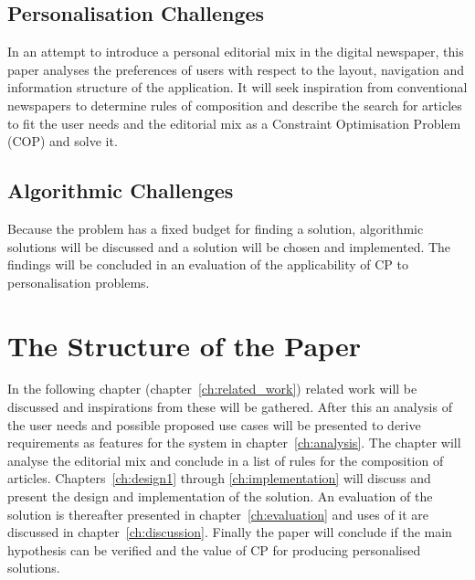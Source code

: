 \subsection{Personalisation Challenges}
In an attempt to introduce a personal editorial mix in the digital newspaper, this paper analyses the preferences of users with respect to the layout, navigation and information structure of the application. It will seek inspiration from conventional newspapers to determine rules of composition and describe the search for articles to fit the user needs and the editorial mix as a Constraint Optimisation Problem (COP) and solve it. %

\subsection{Algorithmic Challenges}
Because the problem has a fixed budget for finding a solution, algorithmic solutions will be discussed and a solution will be chosen and implemented. The findings will be concluded in an evaluation of the applicability of CP to personalisation problems.

\clearpage
\section{The Structure of the Paper}
In the following chapter (chapter~\ref{ch:related_work}) related work will be discussed and inspirations from these will be gathered. After this an analysis of the user needs and possible proposed use cases will be presented to derive requirements as features for the system in chapter~\ref{ch:analysis}. The chapter will analyse the editorial mix and conclude in a list of rules for the composition of articles. Chapters~\ref{ch:design1} through \ref{ch:implementation} will discuss and present the design and implementation of the solution. An evaluation of the solution is thereafter presented in chapter~\ref{ch:evaluation} and uses of it are discussed in chapter~\ref{ch:discussion}. Finally the paper will conclude if the main hypothesis can be verified and the value of CP for producing personalised solutions.

